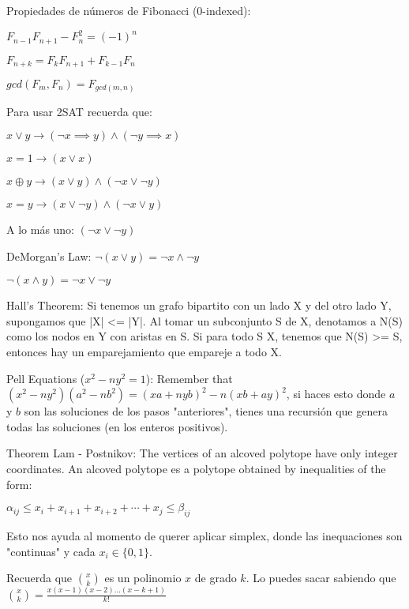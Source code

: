 {    Propiedades de números de Fibonacci (0-indexed): 

    \begin{center}
        $F_{n-1}F_{n+1} - F_n^2 = (-1)^n$

        $F_{n+k} = F_kF_{n+1} + F_{k-1}F_n$

        $gcd(F_m, F_n) = F_{gcd(m,n)}$
    \end{center}


    Para usar 2SAT recuerda que:

    \begin{center}
        $x \lor y     \longrightarrow (\lnot x \implies y) \land (\lnot y \implies x)$

        $x = 1        \longrightarrow (x \lor x)$

        $x \oplus y   \longrightarrow (x \lor y) \land (\lnot x \lor \lnot y)$

        $x = y        \longrightarrow (x \lor \lnot y) \land (\lnot x \lor y)$

        A lo más uno:
        $(\lnot x \lor \lnot y)$


        DeMorgan's Law:
        $\lnot (x \lor y)  = \lnot x \land \lnot y$

        $\lnot (x \land y) = \lnot x \lor \lnot y$
    \end{center}
    
    Hall's Theorem: Si tenemos un grafo bipartito con un lado X y del otro lado Y, supongamos que |X| <= |Y|. Al tomar un subconjunto S de X, denotamos a N(S) como los nodos en Y con aristas en S. Si para todo S \subseteq X, tenemos que N(S) >= S, entonces hay un emparejamiento que empareje a todo X.

    Pell Equations ($x^2 - n y^2 = 1$): Remember that $(x^2 - n y^2)(a^2 - n b^2) = (xa + nyb)^2 - n(xb + ay)^2$, si haces esto donde $a$ y $b$ son las soluciones de los pasos "anteriores", tienes una recursión que genera todas las soluciones (en los enteros positivos).

    Theorem Lam - Postnikov: The vertices of an alcoved polytope have only integer coordinates. An alcoved polytope es a polytope obtained by inequalities of the form:

    $\alpha_{ij} \leq x_i + x_{i+1} + x_{i+2} + \cdots + x_j \leq \beta_{ij}$

    Esto nos ayuda al momento de querer aplicar simplex, donde las inequaciones son "continuas" y cada $x_i \in \{0, 1\}$.

    Recuerda que ${\binom {x}{k}}$ es un polinomio $x$ de grado $k$. Lo puedes sacar sabiendo que ${\binom {x}{k}} = \frac{x(x-1)(x-2)...(x-k+1)}{k!}$

}